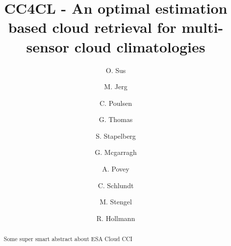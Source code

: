 \documentclass[amt]{style/copernicus}
\begin{document}
\linenumbers

\title{CC4CL - An optimal estimation based cloud retrieval for multi-sensor cloud climatologies}


\author[1]{O. Sus}
\author[1]{M. Jerg}
\author[2]{C. Poulsen}
\author[2]{G. Thomas}
\author[1]{S. Stapelberg}
\author[3]{G. Mcgarragh}
\author[3]{A. Povey}
\author[1]{C. Schlundt}
\author[1]{M. Stengel}
\author[1]{R. Hollmann}









\received{}
\pubdiscuss{} %
\revised{}
\accepted{}
\published{}




\maketitle  %



\begin{abstract}
Some super smart abstract about ESA Cloud CCI
\end{abstract}





\introduction  %

\end{document}
